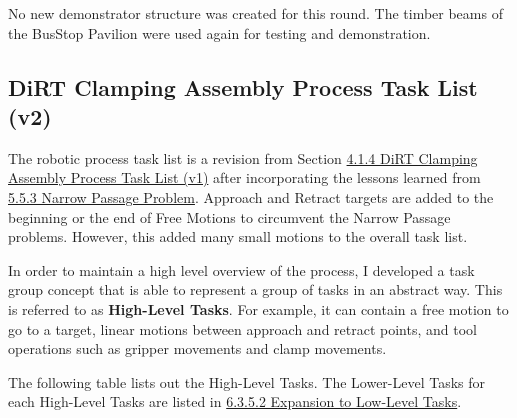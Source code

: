 No new demonstrator structure was created for this round. The timber beams of the BusStop Pavilion were used again for testing and demonstration. 

\subsection{DiRT Clamping Assembly Process Task List (v2)}

The robotic process task list is a revision from Section \uline{4.1.4 DiRT Clamping Assembly Process Task List (v1)} after incorporating the lessons learned from \uline{5.5.3 Narrow Passage Problem}. Approach and Retract targets are added to the beginning or the end of Free Motions to circumvent the Narrow Passage problems. However, this added many small motions to the overall task list.

In order to maintain a high level overview of the process, I developed a task group concept that is able to represent a group of tasks in an abstract way. This is referred to as \textbf{High-Level Tasks}. For example, it can contain a free motion to go to a target, linear motions between approach and retract points, and tool operations such as gripper movements and clamp movements. 

The following table lists out the High-Level Tasks. The Lower-Level Tasks for each High-Level Tasks are listed in \uline{6.3.5.2 Expansion to Low-Level Tasks}. 

